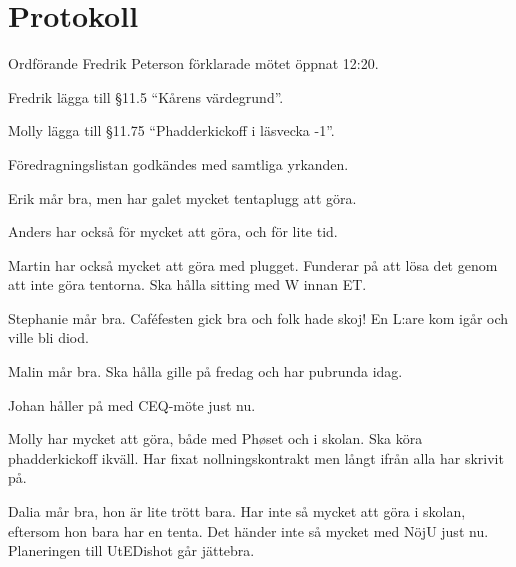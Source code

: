 \documentclass[10pt]{article}
\def\mo{Fredrik Peterson}
\begin{document}
\section*{Protokoll}
\begin{paragrafer}
Ordförande {\mo} förklarade mötet öppnat 12:20.

\valavmo

\valavms

\tosg

\ingaadj

\valavj

Fredrik \ypa lägga till \S11.5 ``Kårens värdegrund''.

Molly \ypa lägga till \S11.75 ``Phadderkickoff i läsvecka -1''.

Föredragningslistan godkändes med samtliga yrkanden.


\begin{fyllnadsval}
\end{fyllnadsval}

\begin{paragrafer}
Erik mår bra, men har galet mycket tentaplugg att göra.

Anders har också för mycket att göra, och för lite tid.

Martin har också mycket att göra med plugget. Funderar på att lösa det genom att inte göra tentorna. Ska hålla sitting med W innan ET.

Stephanie mår bra. Caféfesten gick bra och folk hade skoj! En L:are kom igår och ville bli diod.

Malin mår bra. Ska hålla gille på fredag och har pubrunda idag.

Johan håller på med CEQ-möte just nu.

Molly har mycket att göra, både med Phøset och i skolan. Ska köra phadderkickoff ikväll. Har fixat nollningskontrakt men långt ifrån alla har skrivit på.

Dalia mår bra, hon är lite trött bara. Har inte så mycket att göra i skolan, eftersom hon bara har en tenta. Det händer inte så mycket med NöjU just nu. Planeringen till UtEDishot går jättebra.


\end{paragrafer}
\end{paragrafer}
\end{document}
